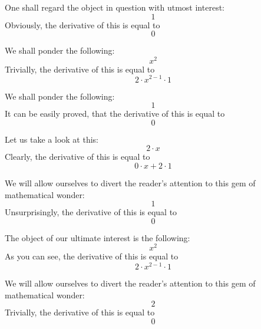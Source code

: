 \documentclass{article}
\begin{document}
One shall regard the object in question with utmost interest:
\begin{equation}
1 
\end{equation}
Obviously, the derivative of this is equal to
\begin{equation}
0 
\end{equation}

We shall ponder the following:
\begin{equation}
x ^{2 } 
\end{equation}
Trivially, the derivative of this is equal to
\begin{equation}
2 \cdot x ^{2 - 1 } \cdot 1 
\end{equation}

We shall ponder the following:
\begin{equation}
1 
\end{equation}
It can be easily proved, that the derivative of this is equal to
\begin{equation}
0 
\end{equation}

Let us take a look at this:
\begin{equation}
2 \cdot x 
\end{equation}
Clearly, the derivative of this is equal to
\begin{equation}
0 \cdot x + 2 \cdot 1 
\end{equation}

We will allow ourselves to divert the reader's attention to this gem of mathematical wonder:
\begin{equation}
1 
\end{equation}
Unsurprisingly, the derivative of this is equal to
\begin{equation}
0 
\end{equation}

The object of our ultimate interest is the following:
\begin{equation}
x ^{2 } 
\end{equation}
As you can see, the derivative of this is equal to
\begin{equation}
2 \cdot x ^{2 - 1 } \cdot 1 
\end{equation}

We will allow ourselves to divert the reader's attention to this gem of mathematical wonder:
\begin{equation}
2 
\end{equation}
Trivially, the derivative of this is equal to
\begin{equation}
0 
\end{equation}
\end{document}
